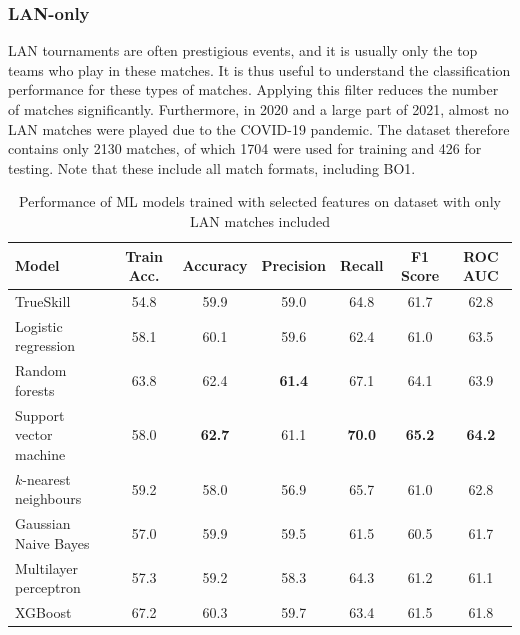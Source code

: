 \subsubsection{LAN-only}

LAN tournaments are often prestigious events, and it is usually only the top teams who play in these matches. It is thus useful to understand the classification performance for these types of matches. Applying this filter reduces the number of matches significantly. Furthermore, in 2020 and a large part of 2021, almost no LAN matches were played due to the COVID-19 pandemic. The dataset therefore contains only 2130 matches, of which 1704 were used for training and 426 for testing. Note that these include all match formats, including BO1. 

\begin{table}[h!]
	\centering
	\small
	\begin{adjustbox}{center} %
		\begin{tabular}{ |l|c|c|c|c|c|c| }
			\hline
			\rule{0pt}{2.6ex} \textbf{Model} & \textbf{Train Acc.} & \textbf{Accuracy} & \textbf{Precision} & \textbf{Recall} & \textbf{F1 Score} & \textbf{ROC AUC} \\
			\hline
			\rule{0pt}{2.6ex} TrueSkill                 & 54.8 & 59.9 & 59.0 & 64.8 & 61.7 & 62.8 \\ \hline
			\rule{0pt}{2.6ex} Logistic regression       & 58.1 & 60.1 & 59.6 & 62.4 & 61.0 & 63.5 \\
			\rule{0pt}{2.6ex} Random forests            & 63.8 & 62.4 & \textbf{61.4} & 67.1 & 64.1 & 63.9 \\
			\rule{0pt}{2.6ex} Support vector machine    & 58.0 & \textbf{62.7} & 61.1 & \textbf{70.0} & \textbf{65.2} & \textbf{64.2} \\
			\rule{0pt}{2.6ex} $k$-nearest neighbours 	& 59.2 & 58.0 & 56.9 & 65.7 & 61.0 & 62.8 \\
			\rule{0pt}{2.6ex} Gaussian Naive Bayes      & 57.0 & 59.9 & 59.5 & 61.5 & 60.5 & 61.7 \\
			\rule{0pt}{2.6ex} Multilayer perceptron     & 57.3 & 59.2 & 58.3 & 64.3 & 61.2 & 61.1 \\
			\rule{0pt}{2.6ex} XGBoost                   & 67.2 & 60.3 & 59.7 & 63.4 & 61.5 & 61.8 \\
			\hline
		\end{tabular}
	\end{adjustbox}
	\caption{Performance of ML models trained with selected features on dataset with only LAN matches included}
	\label{table:0}
\end{table}

